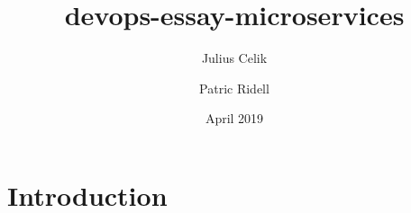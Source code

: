 \documentclass{article}
\title{devops-essay-microservices}
\author{Julius Celik \and Patric Ridell}
\date{April 2019}
\begin{document}
\maketitle

\section{Introduction}
\end{document}

